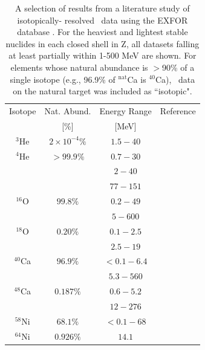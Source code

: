 \begin{table}[ht]
    \caption{A selection of results from a literature study of isotopically-
    resolved \tot\ data using the EXFOR database \cite{EXFORDatabase}. For the
    heaviest and lightest stable nuclides in each closed shell in Z, all
    datasets falling at least partially within 1-500 MeV are shown. For elements
    whose natural abundance is $>$90\% of a single isotope (e.g.,
    96.9\% of $^{\text{nat}}$Ca is $^{40}$Ca), \tot\ data on the natural
    target was included as ``isotopic".} \label{tab:title}
    \label{IsotopicCrossSectionTable}
    \begin{center}
        \begin{tabular}{ c c c c }
            \hline
            Isotope & Nat. Abund. & Energy Range & Reference\\
                    & [\%] & [MeV] & \\

            \hline

            $^{3}$He & $2\times 10^{-4}\%$ & $1.5 - 40$ & \cite{Haesner1983}\\
            $^{4}$He & $>99.9\%$ & $0.7-30$ & \cite{Goulding1973}\\
            & & $2-40$ & \cite{Haesner1983}\\
            & & $77-151$ & \cite{Measday1966}\\

            $^{16}$O & $99.8\%$ & $0.2-49$ & \cite{Perey1972}\\
            & & $5-600$ & \cite{Finlay1993}\\

            $^{18}$O & $0.20\%$ & $0.1-2.5$ & \cite{Vaughn1965}\\
            & & $2.5-19$ & \cite{Salisbury1965}\\

            $^{40}$Ca & $96.9\%$ & $<0.1-6.4$ & \cite{Johnson1973}\\
            & & $5.3-560$ & \cite{Abfalterer2001}\\

            $^{48}$Ca & $0.187\%$ & $0.6-5.2$ & \cite{Harvey1985}\\
            & & $12-276$ & \cite{Shane2010}\\

            $^{58}$Ni & $68.1\%$ & $<0.1-68$ & \cite{Perey1993}\\

            $^{64}$Ni & $0.926\%$ & $14.1$ & \cite{Dukarevich1967}\\


\end{tabular}
\end{center}
\end{table}

